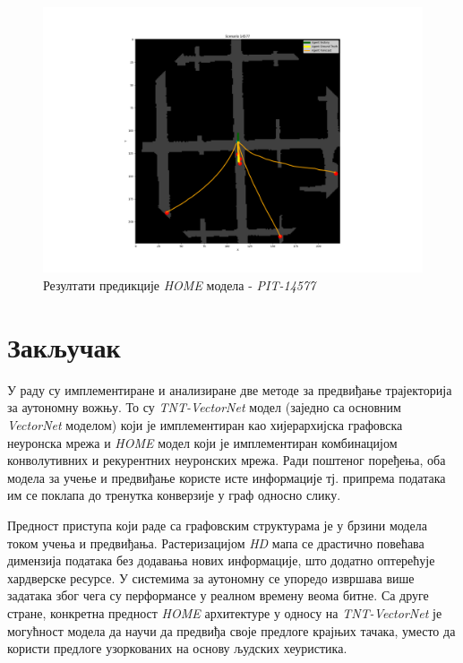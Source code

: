 \documentclass[11pt,oneside]{memoir}
\begin{document}
\begin{figure}[H]
  \centering
  \includegraphics[width=1.0\textwidth]{images/home_PIT_14577.png}
  \caption{Резултати предикције \textit{HOME} модела - \textit{PIT-14577} \label{home-PIT-14577}}
\end{figure}

\chapter{Закључак}

У раду су имплементиране и анализиране две методе за предвиђање трајекторија за аутономну вожњу. 
То су \textit{TNT-VectorNet} модел (заједно са основним \textit{VectorNet} моделом) који је имплементиран као хијерархијска графовска неуронска мрежа
и \textit{HOME} модел који је имплементиран комбинацијом конволутивних и рекурентних неуронских мрежа. Ради поштеног поређења, оба
модела за учење и предвиђање користе исте информације тј. припрема података им се поклапа до тренутка конверзије у граф односно слику.

Предност приступа који раде са графовским структурама је у брзини модела током учења и предвиђања. Растеризацијом \textit{HD} мапа 
се драстично повећава димензија података без додавања нових информације, што додатно оптерећује хардверске ресурсе. У системима за аутономну
се упоредо извршава више задатака због чега су перформансе у реалном времену веома битне. Са друге стране, конкретна предност
\textit{HOME} архитектуре у односу на \textit{TNT-VectorNet} је могућност модела да научи да предвиђа своје предлоге крајњих тачака,
уместо да користи предлоге узоркованих на основу људских хеуристика. 
\end{document}
